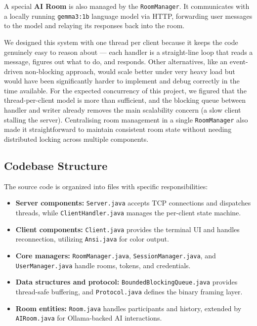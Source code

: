 \documentclass[12pt,a4paper]{article}
\begin{document}
A special \textbf{AI Room} is also managed by the \texttt{RoomManager}. It
communicates with a locally running \texttt{gemma3:1b} language model via
HTTP, forwarding user messages to the model and relaying its responses back
into the room.

\bigskip
We designed this system with one thread per client because it keeps the code genuinely easy to
reason about --- each handler is a straight-line loop that reads a message,
figures out what to do, and responds. Other alternatives, like an event-driven
non-blocking approach, would scale better under very heavy
load but would have been significantly harder to implement and debug correctly
in the time available. For the expected concurrency of this project, we figured that the
thread-per-client model is more than sufficient, and the blocking queue between
handler and writer already removes the main scalability concern (a slow client
stalling the server). Centralising room management in a single
\texttt{RoomManager} also made it straightforward to maintain consistent room
state without needing distributed locking across multiple components.

\subsection{Codebase Structure}
The source code is organized into files with specific responsibilities:
\begin{itemize}
  \item \textbf{Server components:} \texttt{Server.java} accepts TCP connections and dispatches threads, while \texttt{ClientHandler.java} manages the per-client state machine.
  \item \textbf{Client components:} \texttt{Client.java} provides the terminal UI and handles reconnection, utilizing \texttt{Ansi.java} for color output.
  \item \textbf{Core managers:} \texttt{RoomManager.java}, \texttt{SessionManager.java}, and \texttt{UserManager.java} handle rooms, tokens, and credentials.
  \item \textbf{Data structures and protocol:} \texttt{BoundedBlockingQueue.java} provides thread-safe buffering, and \texttt{Protocol.java} defines the binary framing layer.
  \item \textbf{Room entities:} \texttt{Room.java} handles participants and history, extended by \texttt{AIRoom.java} for Ollama-backed AI interactions.
\end{itemize}
\end{document}
